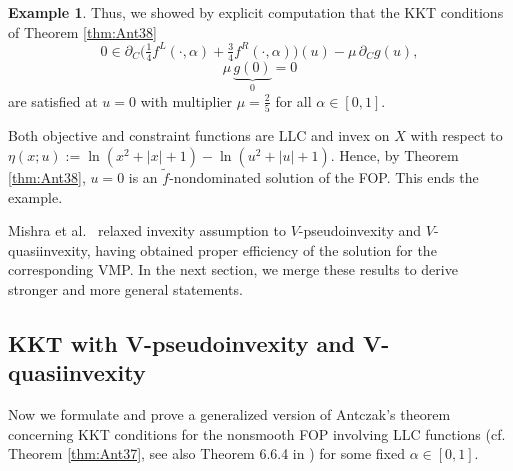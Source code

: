 \documentclass{article}
\theoremstyle{definition}
\newtheorem{example}[maar]{Example}
\begin{document}
\begin{example}{\cite{Ant}}
Thus, we showed by explicit computation that the KKT conditions of Theorem \ref{thm:Ant38}
$$
  0\in \partial_C\bigl(\tfrac14 f^{L}(\cdot,\alpha)
                    +\tfrac34 f^{R}(\cdot,\alpha)\bigr)(u)
     -\mu\,\partial_Cg(u),
$$
$$\mu\,\underbrace{g(0)}_{0}=0$$
are satisfied at $u=0$ with multiplier $\mu=\tfrac25$ for all
$\alpha\in[0,1]$.  

Both objective and constraint functions are LLC and invex on $X$
with respect to
\(
  \eta(x;u):=\ln(x^{2}+|x|+1)-\ln(u^{2}+|u|+1).
\)
Hence, by Theorem \ref{thm:Ant38}, $u=0$ is an $\tilde f$-nondominated solution of the FOP. This ends the example.
\end{example}


Mishra et al.~\cite{MisGio} relaxed invexity assumption to \(V\)-pseudoinvexity and
\(V\)-quasiinvexity, having obtained proper efficiency of the solution for the corresponding VMP. In the next section, we merge these results to derive stronger and more general
statements.


\subsection{KKT with V-pseudoinvexity and V-quasiinvexity}
Now we formulate and prove a generalized version of Antczak's theorem concerning KKT conditions for the nonsmooth FOP involving LLC functions (cf. Theorem \ref{thm:Ant37}, see also Theorem 6.6.4 in \cite{MisGio}) for some fixed $ \alpha \in [0,1]$.
\end{document}
